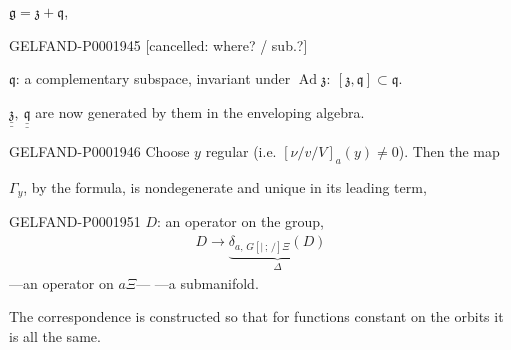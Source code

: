 $\mathfrak g=\mathfrak z+\mathfrak q$,



\begin{GelfandAdjacentEvidence}{GELFAND-P000194}{5}
[cancelled: where? / sub.?]
\end{GelfandAdjacentEvidence}

$\mathfrak q$: a complementary subspace, invariant
under $\operatorname{Ad}\mathfrak z:\ [\mathfrak z,\mathfrak q]\subset\mathfrak q$.



$\underline{\underline{\mathfrak z}},\ \underline{\underline{\mathfrak q}}$
are now generated by them in the enveloping algebra.



\begin{GelfandAdjacentEvidence}{GELFAND-P000194}{6}
Choose $y$ regular (i.e. $[\nu/v/V]_a (y)\ne0$). Then the map



\end{GelfandAdjacentEvidence}

$\Gamma_y$, by the formula, is nondegenerate and unique in its leading term,





\begin{GelfandAdjacentEvidence}{GELFAND-P000195}{1}
$D$: an operator on the group,
\begin{gather*}
D\longrightarrow\underbrace{\delta_{a,\, G[\vert\,;\,/]\Xi}(D)}_{\Delta}
\end{gather*}
—an operator on $a\Xi$—
—a submanifold.



\end{GelfandAdjacentEvidence}

The correspondence is constructed so that for functions constant on the orbits
it is all the same.




